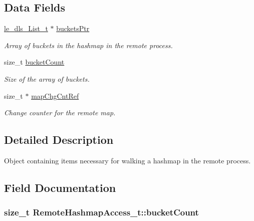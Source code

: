 \subsection*{Data Fields}
\begin{DoxyCompactItemize}
\item 
\hyperlink{structle__dls___list__t}{le\+\_\+dls\+\_\+\+List\+\_\+t} $\ast$ \hyperlink{struct_remote_hashmap_access__t_a404cf287eb894f289af0f9d8102a966a}{buckets\+Ptr}
\begin{DoxyCompactList}\small\item\em Array of buckets in the hashmap in the remote process. \end{DoxyCompactList}\item 
size\+\_\+t \hyperlink{struct_remote_hashmap_access__t_a7a317f38080dc0bc906c9b9b85bffec6}{bucket\+Count}
\begin{DoxyCompactList}\small\item\em Size of the array of buckets. \end{DoxyCompactList}\item 
size\+\_\+t $\ast$ \hyperlink{struct_remote_hashmap_access__t_a937cc41d9a0077e051755c1f44d2f8d8}{map\+Chg\+Cnt\+Ref}
\begin{DoxyCompactList}\small\item\em Change counter for the remote map. \end{DoxyCompactList}\end{DoxyCompactItemize}


\subsection{Detailed Description}
Object containing items necessary for walking a hashmap in the remote process. 

\subsection{Field Documentation}
\subsubsection[{\texorpdfstring{bucket\+Count}{bucketCount}}]{\setlength{\rightskip}{0pt plus 5cm}size\+\_\+t Remote\+Hashmap\+Access\+\_\+t\+::bucket\+Count}\hypertarget{struct_remote_hashmap_access__t_a7a317f38080dc0bc906c9b9b85bffec6}{}\label{struct_remote_hashmap_access__t_a7a317f38080dc0bc906c9b9b85bffec6}


